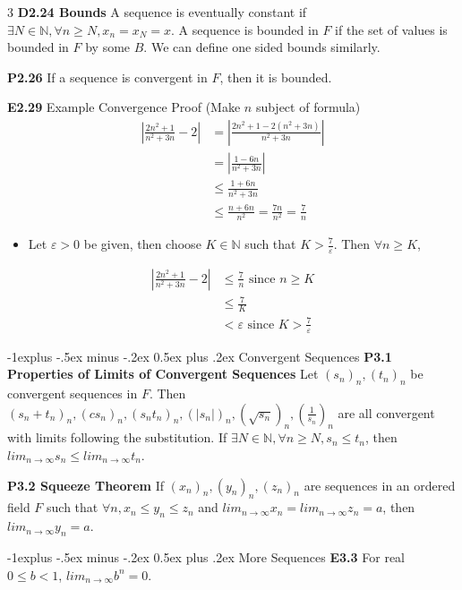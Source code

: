 \documentclass[10pt, landscape]{article}
\makeatletter
\renewcommand{\section}{\@startsection{section}{1}{0mm}%
                                {-1ex plus -.5ex minus -.2ex}%
                                {0.5ex plus .2ex}%
                                {\normalfont\large\bfseries}}
\renewcommand{\section}{\@startsection{section}{2}{0mm}%
                                {-1explus -.5ex minus -.2ex}%
                                {0.5ex plus .2ex}%
                                {\normalfont\normalsize\bfseries}}
\makeatother
\begin{document}
\begin{multicols*}{3}
\textbf{D2.24 Bounds} A sequence is eventually constant if $\exists N \in \mathbb{N}, \forall n \geq N, x_n=x_N=x$. A sequence is bounded in $F$ if the set of values is bounded in $F$ by some $B$. We can define one sided bounds similarly.

\textbf{P2.26} If a sequence is convergent in $F$, then it is bounded.

\textbf{E2.29} Example Convergence Proof (Make $n$ subject of formula)
\begin{align*} 
\left|\frac{2n^2+1}{n^2+3n}-2\right|&=\left|\frac{2n^2+1-2(n^2+3n)}{n^2+3n}\right|\\
&=\left|\frac{1-6n}{n^2+3n}\right|\\
&\leq \frac{1+6n}{n^2+3n}\\
&\leq \frac{n+6n}{n^2}=\frac{7n}{n^2}=\frac{7}{n}
\end{align*}
\begin{itemize}
    \item Let $\varepsilon > 0$ be given, then choose $K\in \mathbb{N}$ such that $K  > \frac{7}{\varepsilon}$. Then $\forall n \geq K$,
\end{itemize}
\begin{align*}
\left|\frac{2n^2+1}{n^2+3n}-2\right|&\leq \frac{7}{n} \text{ since $n \geq K$}\\
&\leq\frac{7}{K}\\
&<\varepsilon \text{ since $K > \frac{7}{\varepsilon}$}
\end{align*}

\section{Convergent Sequences}
\textbf{P3.1 Properties of Limits of Convergent Sequences} Let $(s_n)_n, (t_n)_n$ be convergent sequences in $F$. Then $(s_n+t_n)_n, (cs_n)_n, (s_nt_n)_n, (|s_n|)_n, (\sqrt{s_n})_n, (\frac{1}{s_n})_n$ are all convergent with limits following the substitution. If $\exists N \in \mathbb{N}, \forall n \geq N, s_n \leq t_n$, then $lim_{n\rightarrow\infty}s_n \leq lim_{n\rightarrow \infty}t_n$.

\textbf{P3.2 Squeeze Theorem} If $(x_n)_n, (y_n)_n, (z_n)_n$ are sequences in an ordered field $F$ such that $\forall n, x_n \leq y_n \leq z_n$ and $lim_{n\rightarrow\infty}x_n=lim_{n\rightarrow\infty}z_n=a$, then $lim_{n\rightarrow\infty}y_n=a$.

\section{More Sequences}
\textbf{E3.3} For real $0 \leq b < 1$, $lim_{n\rightarrow\infty}b^n=0$.


\end{multicols*}
\end{document}
